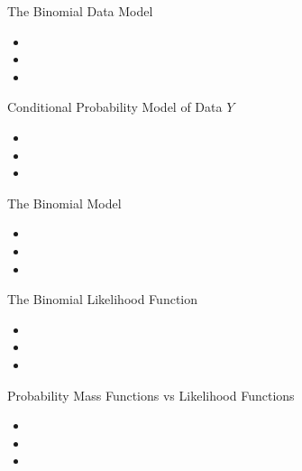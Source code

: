 \documentclass[12pt]{beamer}
\begin{document}
\begin{frame}{}
\begin{block}{The Binomial Data Model}
\begin{itemize}
\item 
\item 
\item 
\end{itemize}
\end{block}
\end{frame}

\begin{frame}{}
\begin{block}{Conditional Probability Model of Data $Y$}
\begin{itemize}
\item 
\item 
\item 
\end{itemize}
\end{block}
\end{frame}

\begin{frame}{}
\begin{block}{The Binomial Model}
\begin{itemize}
\item 
\item 
\item 
\end{itemize}
\end{block}
\end{frame}

\begin{frame}{}
\begin{block}{The Binomial Likelihood Function}
\begin{itemize}
\item 
\item 
\item 
\end{itemize}
\end{block}
\end{frame}

\begin{frame}{}
\begin{block}{Probability Mass Functions vs Likelihood Functions}
\begin{itemize}
\item 
\item 
\item 
\end{itemize}
\end{block}
\end{frame}
\end{document}

